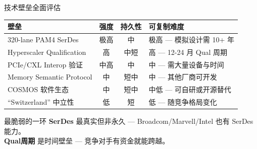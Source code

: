 \documentclass[aspectratio=169, 10pt, UTF8]{ctexbeamer}
\begin{document}
\begin{frame}{技术壁垒全面评估}
  \begin{table}[h]
    \centering
    \begin{tabular}{lccp{}}
      \toprule
      \textbf{壁垒} & \textbf{强度} & \textbf{持久性} & \textbf{可复制难度} \\
      \midrule
      \rowcolor{ieeeGreen!15}
      320-lane PAM4 SerDes & 极高 & 中 & 极高 — 模拟设计需 10+ 年 \\
      \rowcolor{ieeeBlue!12}
      Hyperscaler Qualification & 高 & 中短 & 高 — 12-24 月 Qual 周期 \\
      \rowcolor{ieeeBlue!8}
      PCIe/CXL Interop 验证 & 中高 & 中 & 中 — 需大量设备与时间 \\
      \rowcolor{ieeeOrange!15}
      Memory Semantic Protocol & 中 & 短中 & 中 — 其他厂商可开发 \\
      \rowcolor{ieeeOrange!8}
      COSMOS 软件生态 & 中 & 短中 & 中低 — 可自研或开源替代 \\
      \rowcolor{ieeeOrange!5}
      ``Switzerland'' 中立性 & 低 & 短 & 低 — 随竞争格局变化 \\
      \bottomrule
    \end{tabular}
  \end{table}

  \begin{alertblock}{最脆弱的一环}
    \textbf{SerDes} 最真实但非永久 — Broadcom/Marvell/Intel 也有 SerDes 能力。\\
    \textbf{Qual周期} 是时间壁垒 — 竞争对手有资金就能跨越。
  \end{alertblock}
\end{frame}
\end{document}
